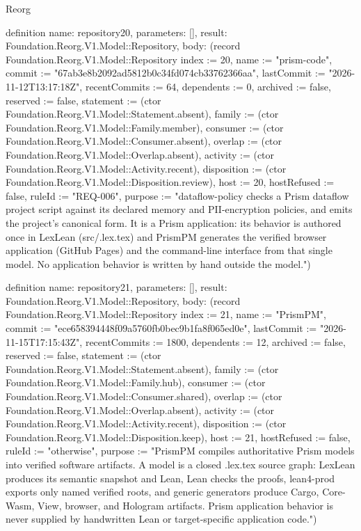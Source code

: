 \begin{lexlean}{Reorg}
\begin{semanticmodule}
definition{
  name: repository20,
  parameters: [],
  result: Foundation.Reorg.V1.Model::Repository,
  body: (record Foundation.Reorg.V1.Model::Repository {index := 20, name := "prism-code", commit := "67ab3e8b2092ad5812b0c34fd074cb33762366aa", lastCommit := "2026-11-12T13:17:18Z", recentCommits := 64, dependents := 0, archived := false, reserved := false, statement := (ctor Foundation.Reorg.V1.Model::Statement.absent), family := (ctor Foundation.Reorg.V1.Model::Family.member), consumer := (ctor Foundation.Reorg.V1.Model::Consumer.absent), overlap := (ctor Foundation.Reorg.V1.Model::Overlap.absent), activity := (ctor Foundation.Reorg.V1.Model::Activity.recent), disposition := (ctor Foundation.Reorg.V1.Model::Disposition.review), host := 20, hostRefused := false, ruleId := "REQ-006", purpose := "dataflow-policy checks a Prism dataflow project script against its declared memory and PII-encryption policies, and emits the project's canonical form. It is a Prism application: its behavior is authored once in LexLean (src/.lex.tex) and PrismPM generates the verified browser application (GitHub Pages) and the command-line interface from that single model. No application behavior is written by hand outside the model."})
}

definition{
  name: repository21,
  parameters: [],
  result: Foundation.Reorg.V1.Model::Repository,
  body: (record Foundation.Reorg.V1.Model::Repository {index := 21, name := "PrismPM", commit := "ece658394448f09a5760fb0bec9b1fa8f065ed0e", lastCommit := "2026-11-15T17:15:43Z", recentCommits := 1800, dependents := 12, archived := false, reserved := false, statement := (ctor Foundation.Reorg.V1.Model::Statement.absent), family := (ctor Foundation.Reorg.V1.Model::Family.hub), consumer := (ctor Foundation.Reorg.V1.Model::Consumer.shared), overlap := (ctor Foundation.Reorg.V1.Model::Overlap.absent), activity := (ctor Foundation.Reorg.V1.Model::Activity.recent), disposition := (ctor Foundation.Reorg.V1.Model::Disposition.keep), host := 21, hostRefused := false, ruleId := "otherwise", purpose := "PrismPM compiles authoritative Prism models into verified software artifacts. A model is a closed .lex.tex source graph: LexLean produces its semantic snapshot and Lean, Lean checks the proofs, lean4-prod exports only named verified roots, and generic generators produce Cargo, Core-Wasm, View, browser, and Hologram artifacts. Prism application behavior is never supplied by handwritten Lean or target-specific application code."})
}


\end{semanticmodule}
\end{lexlean}
